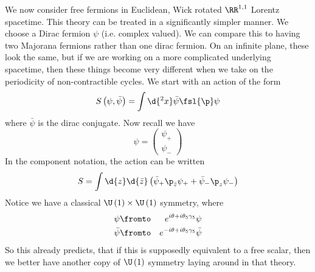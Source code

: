 \documentclass{booc}
\begin{document}
We now consider free fermions in Euclidean, Wick rotated $\RR^{1, 1}$ Lorentz spacetime. 
This theory can be treated in a significantly simpler manner.
We choose a Dirac fermion $\psi$ (i.e. complex valued). 
We can compare this to having two Majorana fermions rather than one dirac fermion. 
On an infinite plane, these look the same, but if we are working on a 
more complicated underlying spacetime, then these things become very different
when we take on the periodicity of non-contractible cycles.
We start with an action of the form
\begin{equation}
S\left( \psi , \bar\psi \right) = 
\int \d{^2 x} \bar \psi \fsl{\p} \psi
\end{equation}
where $\bar \psi$ is the dirac conjugate.
Now recall we have 
\begin{equation}
\psi = 
\begin{pmatrix}
\psi_+ \\
\psi_-
\end{pmatrix}
\end{equation}
In the component notation, the action can be written
\begin{equation}
S = \int \d{z} \d{\bar z}
\left( 
\bar \psi_+ \p_{\bar z} \psi_+ + 
\bar \psi_- \p_z \psi_-
\right)
\end{equation}
Notice we have a classical $\U\left( 1 \right) \times \U\left( 1 \right)$
symmetry, where
\begin{eqnarray}
\psi &\fromto & e^{i\theta + i\theta_5 \gamma_5}
\psi
\\
\bar \psi & \fromto & e^{-i \theta + i\theta_5 \gamma_5} \bar \psi
\end{eqnarray}
So this already predicts, that if this is supposedly 
equivalent to a free scalar, then we better have another
copy of $\U\left( 1 \right)$ symmetry laying around in that theory.
\end{document}
